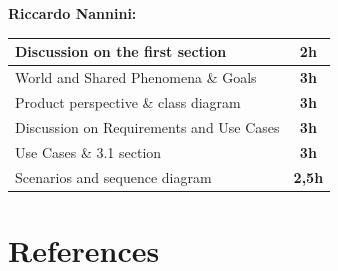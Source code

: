 \documentclass[]{article}
\begin{document}
	
	\textbf{\large \\ \\ Riccardo Nannini:} \\ \newline
		\begin{tabular}{|l|c|}
			\hline
			Discussion on the first section &  \textbf{2h} \\ \hline
			\rowcolor[HTML]{DCDCDC} 
			World and Shared Phenomena \& Goals & \textbf{3h} \\ \hline
			Product perspective \& class diagram & \textbf{3h} \\ \hline
			\rowcolor[HTML]{DCDCDC} 
			Discussion on Requirements and Use Cases & \textbf{3h} \\ \hline
			Use Cases \& 3.1 section & \textbf{3h} \\ \hline
			\rowcolor[HTML]{DCDCDC} 
			Scenarios and sequence diagram & \textbf{2,5h} \\ \hline
		\end{tabular}
	
	\section{References}	
				
\end{document}

